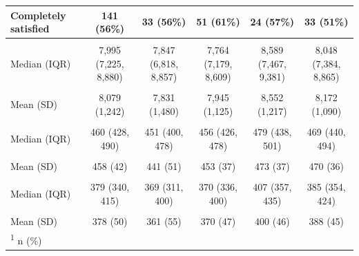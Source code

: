 \documentclass[preprint, 3p,
authoryear]{elsarticle} %
\begin{document}
\begin{table}
{\begin{tabular}[t]{l|c|c|c|c|c}
\hline
\hspace{1em}Completely satisfied & 141 (56\%) & 33 (56\%) & 51 (61\%) & 24 (57\%) & 33 (51\%)\\
\hline
\cellcolor{gray!6}{Steps per day outside of semester (average)} & \cellcolor{gray!6}{} & \cellcolor{gray!6}{} & \cellcolor{gray!6}{} & \cellcolor{gray!6}{} & \cellcolor{gray!6}{}\\
\hline
\hspace{1em}Median (IQR) & 7,995 (7,225, 8,880) & 7,847 (6,818, 8,857) & 7,764 (7,179, 8,609) & 8,589 (7,467, 9,381) & 8,048 (7,384, 8,865)\\
\hline
\cellcolor{gray!6}{\hspace{1em}Range} & \cellcolor{gray!6}{4,398, 11,670} & \cellcolor{gray!6}{4,398, 11,321} & \cellcolor{gray!6}{5,784, 11,670} & \cellcolor{gray!6}{6,580, 11,108} & \cellcolor{gray!6}{5,864, 10,803}\\
\hline
\hspace{1em}Mean (SD) & 8,079 (1,242) & 7,831 (1,480) & 7,945 (1,125) & 8,552 (1,217) & 8,172 (1,090)\\
\hline
\cellcolor{gray!6}{Hours of sleep per day outside semester (average)} & \cellcolor{gray!6}{} & \cellcolor{gray!6}{} & \cellcolor{gray!6}{} & \cellcolor{gray!6}{} & \cellcolor{gray!6}{}\\
\hline
\hspace{1em}Median (IQR) & 460 (428, 490) & 451 (400, 478) & 456 (426, 478) & 479 (438, 501) & 469 (440, 494)\\
\hline
\cellcolor{gray!6}{\hspace{1em}Range} & \cellcolor{gray!6}{309, 565} & \cellcolor{gray!6}{309, 534} & \cellcolor{gray!6}{374, 546} & \cellcolor{gray!6}{401, 535} & \cellcolor{gray!6}{412, 565}\\
\hline
\hspace{1em}Mean (SD) & 458 (42) & 441 (51) & 453 (37) & 473 (37) & 470 (36)\\
\hline
\cellcolor{gray!6}{Exercise outside of semester (minutes per week)} & \cellcolor{gray!6}{} & \cellcolor{gray!6}{} & \cellcolor{gray!6}{} & \cellcolor{gray!6}{} & \cellcolor{gray!6}{}\\
\hline
\hspace{1em}Median (IQR) & 379 (340, 415) & 369 (311, 400) & 370 (336, 400) & 407 (357, 435) & 385 (354, 424)\\
\hline
\cellcolor{gray!6}{\hspace{1em}Range} & \cellcolor{gray!6}{202, 497} & \cellcolor{gray!6}{232, 476} & \cellcolor{gray!6}{202, 483} & \cellcolor{gray!6}{314, 477} & \cellcolor{gray!6}{301, 497}\\
\hline
\hspace{1em}Mean (SD) & 378 (50) & 361 (55) & 370 (47) & 400 (46) & 388 (45)\\
\hline
\multicolumn{6}{l}{\rule{0pt}{1em}\textsuperscript{1} n (\%)}\\
\end{tabular}}
\end{table}
\end{document}

